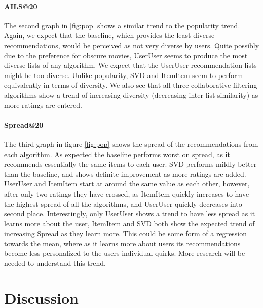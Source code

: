 \documentclass[letterpaper]{sig-alternate}
\begin{document}
  \vspace{-0.5em}
  \paragraph{AILS@20}
  The second graph in \ref{fig:pop} shows a similar trend to the popularity trend.
  Again, we expect that the baseline, which provides the least diverse recommendations, would be perceived as not very diverse by users.
  Quite possibly due to the preference for obscure movies, UserUser seems to produce the most diverse lists of any algorithm.
  We expect that the UserUser recommendation lists might be too diverse.
  Unlike popularity, SVD and ItemItem seem to perform equivalently in terms of diversity.
  We also see that all three collaborative filtering algorithms show a trend of increasing diversity (decreasing inter-list similarity) as more ratings are entered.

  \vspace{-0.5em}
  \paragraph{Spread@20}
  The third graph in figure \ref{fig:pop} shows the spread of the recommendations from each algorithm.
  As expected the baseline performs worst on spread, as it recommends essentially the same items to each user.
  SVD performs mildly better than the baseline, and shows definite improvement as more ratings are added.
  UserUser and ItemItem start at around the same value as each other, however, after only two ratings they have crossed, as ItemItem quickly increases to have the highest spread of all the algorithms, and UserUser quickly decreases into second place.
  Interestingly, only UserUser shows a trend to have less spread as it learns more about the user, ItemItem and SVD both show the expected trend of increasing Spread as they learn more.
  This could be some form of a regression towards the mean, where as it learns more about users its recommendations become less personalized to the users individual quirks.
  More research will be needed to understand this trend.
  

\section{Discussion}
\end{document}
